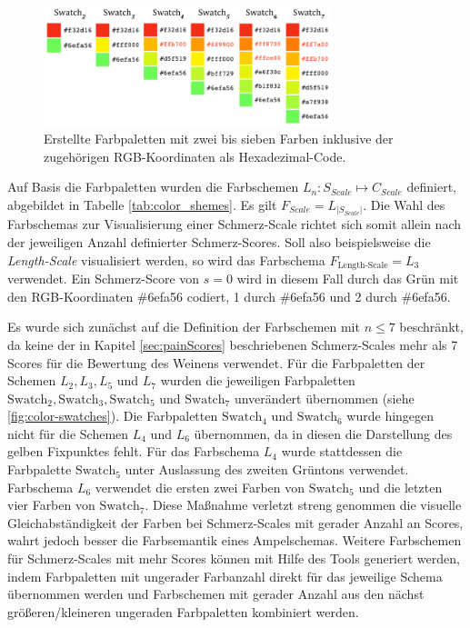 \begin{figure}[h]
	\centering
	\includegraphics[width=0.75\textwidth]{bilder/colorpics.png}
	\caption[Farbpaletten mit zwei bis sieben Farben ]{Erstellte Farbpaletten mit zwei bis sieben Farben inklusive der zugehörigen RGB-Koordinaten als Hexadezimal-Code.}
	\label{fig:color-swatches}
\end{figure}

Auf Basis die Farbpaletten wurden die Farbschemen $L_{n}: S_{Scale} \mapsto C_{Scale}$ definiert, abgebildet in Tabelle \ref{tab:color_shemes}. Es gilt $F_{Scale} = L_{|S_{Scale}|}$. Die Wahl des Farbschemas zur Visualisierung einer Schmerz-Scale richtet sich somit allein nach der jeweiligen Anzahl definierter Schmerz-Scores. Soll also beispielsweise die \emph{Length-Scale} visualisiert werden, so wird das Farbschema $F_{\text{Length-Scale}} = L_3$ verwendet. Ein Schmerz-Score von $s = 0$ wird in diesem Fall durch das Grün mit den RGB-Koordinaten \#6efa56 codiert, 1 durch \#6efa56 und 2 durch \#6efa56.

Es wurde sich zunächst auf die Definition der Farbschemen mit $n \leq 7$ beschränkt, da keine der in Kapitel \ref{sec:painScores} beschriebenen Schmerz-Scales mehr als 7 Scores für die Bewertung des Weinens verwendet. Für die Farbpaletten der Schemen $L_2, L_3, L_5$ und $L_7$ wurden die jeweiligen Farbpaletten $\text{Swatch}_2, \text{Swatch}_3,\text{Swatch}_5$ und $\text{Swatch}_7$ unverändert übernommen (siehe \autoref{fig:color-swatches}). Die Farbpaletten $\text{Swatch}_4$ und $\text{Swatch}_6$ wurde hingegen nicht für die Schemen $L_4$ und $L_6$ übernommen, da in diesen die Darstellung des gelben Fixpunktes fehlt. Für das Farbschema $L_4$ wurde stattdessen die Farbpalette $\text{Swatch}_5$ unter Auslassung des zweiten Grüntons verwendet. Farbschema $L_6$ verwendet die ersten zwei Farben von $\text{Swatch}_5$ und die letzten vier Farben von $\text{Swatch}_7$. Diese Maßnahme verletzt streng genommen die visuelle Gleichabständigkeit der Farben bei Schmerz-Scales mit gerader Anzahl an Scores, wahrt jedoch besser die Farbsemantik eines Ampelschemas. Weitere Farbschemen für Schmerz-Scales mit mehr Scores können mit Hilfe des Tools generiert werden, indem Farbpaletten mit ungerader Farbanzahl direkt für das jeweilige Schema übernommen werden und Farbschemen mit gerader Anzahl aus den nächst größeren/kleineren ungeraden Farbpaletten kombiniert werden. 

